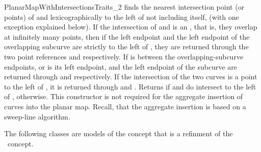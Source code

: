 \begin{ccRefConcept}{PlanarMapWithIntersectionsTraits_2}
	 {finds the nearest intersection point (or points) of  and
	    lexicographically to the left of  not including
	    itself, (with one exception explained below).
	   If the intersection of  and  is an
	   , that is, they overlap at infinitely many
	   points, then if the left endpoint and the left endpoint of the
	   overlapping subcurve are strictly to the left of , they are
	   returned through the two point references  and 
	   respectively. If  is between the overlapping-subcurve
	   endpoints, or  is its left endpoint,  and the left
	   endpoint of the subcurve are returned through  and 
	   respectively. If the intersection of the two curves is a point to the
	   left of , it is returned through  and .
	   Returns  if  and  do intersect to the left
	   of ,  otherwise. This constructor is not
	   required for the aggregate insertion of curves into the planar map.
	   Recall, that the aggregate insertion is based on a sweep-line
	   algorithm.}

\ccHasModels
The following classes are models of the 
 concept that is a refinment of the \ccRefName\
concept. 

  \\
  \\
  \\

\end{ccRefConcept}

\ccRefPageEnd
